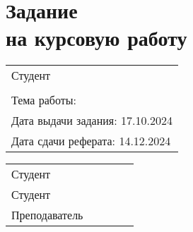 \section*{Задание\\ на курсовую работу}

\setlength{\extrarowheight}{7mm}
\begin{tabularx}{\textwidth}{>{\raggedright\arraybackslash}X}
	Студент \studentn{} \studentr{}                                  \\
	\group                                                           \\
	Тема работы: \theme                                              \\
	Дата выдачи задания: 17.10.2024                                  \\
	Дата сдачи реферата: 14.12.2024                                  \\
\end{tabularx}
\setlength{\extrarowheight}{0mm}

\vspace{50mm}

\setlength{\extrarowheight}{4mm}
\begin{tabulary}{\textwidth}{LCCCL}
	Студент & \hspace{0.5cm} & \hspace{4.5cm} & \hspace{0.5cm} & \studentn \\
	Студент & \hspace{0.5cm} & \hspace{4.5cm} & \hspace{0.5cm} & \studentr \\
	Преподаватель & \hspace{0.5cm} & \hspace{4.5cm} & \hspace{0.5cm} & \teacher \\
\end{tabulary}
\setlength{\extrarowheight}{0mm}

\newpage

